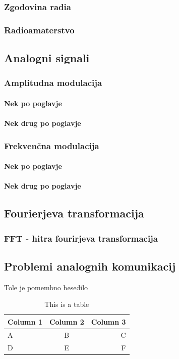 \documentclass[12pt]{article}
\begin{document}
\subsubsection{Zgodovina radia}
\subsubsection{Radioamaterstvo}
\subsection{Analogni signali}
\subsubsection{Amplitudna modulacija}
\paragraph{Nek po poglavje}
\paragraph{Nek drug po poglavje}
\subsubsection{Frekvenčna modulacija}
\paragraph{Nek po poglavje}
\paragraph{Nek drug po poglavje}

\newpage
\subsection{Fourierjeva transformacija}
\subsubsection{FFT - hitra fourirjeva transformacija}
\subsection{Problemi analognih komunikacij}
Tole je pomembno besedilo

\begin{table}[h]
    \centering
    \caption{This is a table}
    \begin{tabular}{lcr}
      \hline
      Column 1 & Column 2 & Column 3 \\
      \hline
      A & B & C \\
      D & E & F \\
      \hline
    \end{tabular}
    \label{tab:table}
\end{table}  
\end{document}

